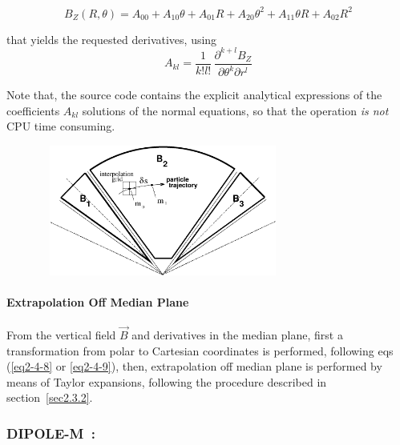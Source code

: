 {$$B_Z(R,\theta) = A_{00} + A_{10}\theta + A_{01}R + A_{20}\theta^2 + A_{11}\theta R + A_{02}R^2 $$

\noindent  that yields the requested   derivatives, using 
$$	A_{kl} = \dfrac{1 }{ k!l!}\,  \dfrac{\partial^{ k+l}B_Z }{ \partial \theta^k\partial r^l} $$

\noindent Note that, the source code contains the explicit analytical 
expressions of the coefficients $A_{kl}$ solutions of the normal 
equations, so that the operation {\it is not}   CPU time consuming. 

\begin{figure}[h]
 \begin{center}
\includegraphics*[bbllx=30,bblly=150,bburx=590,bbury=400,width=8.2cm,height=4.3cm]{grid.eps}
{\setlength{\captionwidth}{12cm}
  }
  \end{center}
\end{figure}


\bigskip

\paragraph{Extrapolation Off Median Plane} 

\noindent From the vertical field $ \vec  B $ and  derivatives in the median plane, 
first a transformation from polar to Cartesian coordinates is 
performed, following eqs (\ref{eq2-4-8} or \ref{eq2-4-9}), then,  extrapolation off median plane is 
performed by means of Taylor expansions, following the procedure described in section~\ref{sec2.3.2}. 






\newpage

\subsubsection*{DIPOLE-M~: \DIPOLEMTitl} \label{DIPOLE-M} 
\medskip

}
